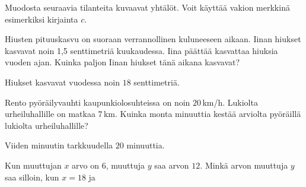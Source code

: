 \begin{tehtavasivu}
\begin{tehtava}
Muodosta seuraavia tilanteita kuvaavat yhtälöt. Voit käyttää vakion merkkinä esimerkiksi kirjainta $c$. %
\begin{vastaus}
\end{vastaus}
\end{tehtava}

\begin{tehtava}
Hiusten pituuskasvu on suoraan verrannollinen kuluneeseen aikaan. Iinan hiukset kasvavat noin 1,5 senttimetriä kuukaudessa. Iina päättää kasvattaa hiuksia vuoden ajan. Kuinka paljon Iinan hiukset tänä aikana kasvavat?
\begin{vastaus}
Hiukset kasvavat vuodessa noin $18$ senttimetriä.
\end{vastaus}
\end{tehtava}

\begin{tehtava}
Rento pyöräilyvauhti kaupunkiolosuhteissa on noin $20$\,km/h. Lukiolta urheiluhallille on matkaa $7$\,km. Kuinka monta minuuttia kestää arviolta pyöräillä lukiolta urheiluhallille?
\begin{vastaus}
Viiden minuutin tarkkuudella $20$ minuuttia.
\end{vastaus}
\end{tehtava}

\begin{tehtava}
Kun muuttujan $x$ arvo on $6$, muuttuja $y$ saa arvon $12$. Minkä arvon muuttuja $y$ saa silloin, kun $x=18$ ja
	\begin{vastaus}
	\end{vastaus}
\end{tehtava}


\end{tehtavasivu}

